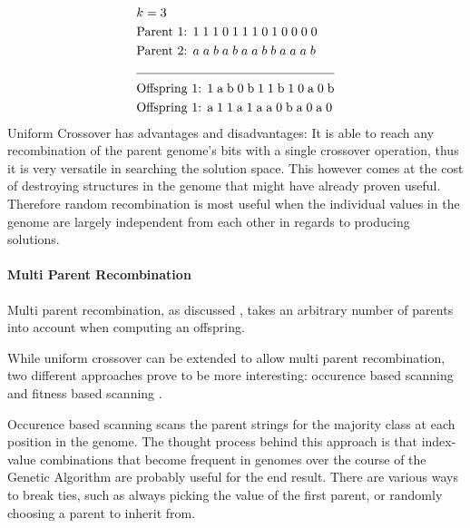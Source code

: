 \documentclass[11pt,a4paper,twoside,openright]{scrbook}
\begin{document}
\begin{equation*}
  \begin{aligned}
    & k = 3 \\
    & \text{Parent 1: } 1\;1\;1\;0\;1\;1\;1\;0\;1\;0\;0\;0\;0 \\
    & \text{Parent 2: } a\;a\;b\;a\;b\;a\;a\;b\;b\;a\;a\;a\;b \\
    \cline{1-2}
    & \text{Offspring 1: 1\;a\;b\;0\;b\;1\;1\;b\;1\;0\;a\;0\;b} \\
    & \text{Offspring 1: a\;1\;1\;a\;1\;a\;a\;0\;b\;a\;0\;a\;0}
  \end{aligned}
\end{equation*}
Uniform Crossover has advantages and disadvantages: It is able to reach any recombination of the parent genome's bits with a single crossover operation, thus it is very versatile in searching the solution space. This however comes at the cost of destroying structures in the genome that might have already proven useful. Therefore random recombination is most useful when the individual values in the genome are largely independent from each other in regards to producing solutions.

\paragraph{Multi Parent Recombination}
Multi parent recombination, as discussed \cite{Eiben94}, takes an arbitrary number of parents into account when computing an offspring.

While uniform crossover can be extended to allow multi parent recombination, two different approaches prove to be more interesting: occurence based scanning \cite[p.\,2]{Eiben94} and fitness based scanning \cite[p.\,3]{Eiben94}.

Occurence based scanning scans the parent strings for the majority class at each position in the genome. The thought process behind this approach is that index-value combinations that become frequent in genomes over the course of the Genetic Algorithm are probably useful for the end result. There are various ways to break ties, such as always picking the value of the first parent, or randomly choosing a parent to inherit from. \\
\end{document}
